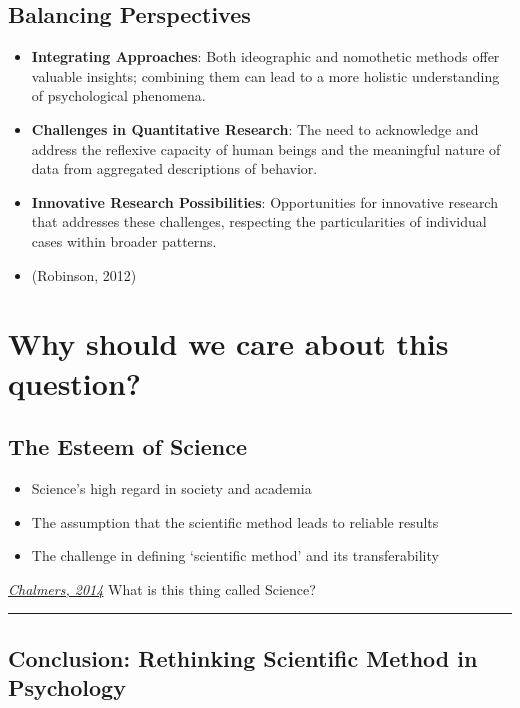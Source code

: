 \documentclass[
  letterpaper,
  DIV=11,
  numbers=noendperiod]{scrartcl}
\providecommand{\tightlist}{%
  \setlength{\itemsep}{0pt}\setlength{\parskip}{0pt}}\usepackage{longtable,booktabs,array}
\begin{document}
\subsection{Balancing Perspectives}\label{balancing-perspectives}

\begin{itemize}
\tightlist
\item
  \textbf{Integrating Approaches}: Both ideographic and nomothetic
  methods offer valuable insights; combining them can lead to a more
  holistic understanding of psychological phenomena.
\item
  \textbf{Challenges in Quantitative Research}: The need to acknowledge
  and address the reflexive capacity of human beings and the meaningful
  nature of data from aggregated descriptions of behavior.
\item
  \textbf{Innovative Research Possibilities}: Opportunities for
  innovative research that addresses these challenges, respecting the
  particularities of individual cases within broader patterns.
\item
  (Robinson, 2012)
\end{itemize}

\section{Why should we care about this
question?}\label{why-should-we-care-about-this-question}

\subsection{The Esteem of Science}\label{the-esteem-of-science}

\begin{itemize}
\tightlist
\item
  Science's high regard in society and academia
\item
  The assumption that the scientific method leads to reliable results
\item
  The challenge in defining `scientific method' and its transferability
\end{itemize}

\href{source}{\emph{Chalmers, 2014}} What is this thing called Science?

\begin{center}\rule{0.5\linewidth}{0.5pt}\end{center}

\subsection{Conclusion: Rethinking Scientific Method in
Psychology}\label{conclusion-rethinking-scientific-method-in-psychology}
\end{document}
